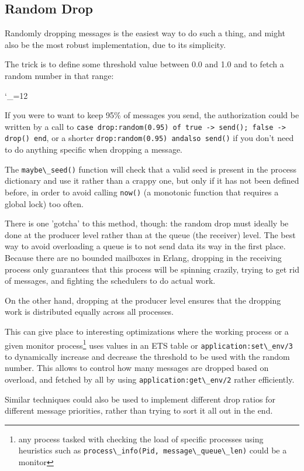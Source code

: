 \documentclass[11pt, oneside]{book}   	%
\newcommand{\function}[1]{\Verb`#1`}
\newcommand{\expression}[1]{\Verb`#1`}
\def\includecode{\begingroup
\catcode`\_=12
\includecodeB}
\newcommand{\includecodeB}[2][erlang]{\VerbatimInput[frame=single,label=#1/#2,fontsize=\small]{#1/#2}\endgroup}
\begin{document}
\subsection{Random Drop}

Randomly dropping messages is the easiest way to do such a thing, and might also be the most robust implementation, due to its simplicity.

The trick is to define some threshold value between 0.0 and 1.0 and to fetch a random number in that range:

\includecode[erlang]{drop.erl}

If you were to want to keep 95\% of messages you send, the authorization could be written by a call to \expression{case drop:random(0.95) of true -> send(); false -> drop() end}, or a shorter \expression{drop:random(0.95) andalso send()} if you don't need to do anything specific when dropping a message. 

The \function{maybe\_seed()} function will check that a valid seed is present in the process dictionary and use it rather than a crappy one, but only if it has not been defined before, in order to avoid calling \function{now()} (a monotonic function that requires a global lock) too often.

There is one 'gotcha' to this method, though: the random drop must ideally be done at the producer level rather than at the queue (the receiver) level. The best way to avoid overloading a queue is to not send data its way in the first place. Because there are no bounded mailboxes in Erlang, dropping in the receiving process only guarantees that this process will be spinning crazily, trying to get rid of messages, and fighting the schedulers to do actual work.

On the other hand, dropping at the producer level ensures that the dropping work is distributed equally across all processes.

This can give place to interesting optimizations where the working process or a given monitor process\footnote{any process tasked with checking the load of specific processes using heuristics such as \expression{process\_info(Pid, message\_queue\_len)} could be a monitor} uses values in an ETS table or \function{application:set\_env/3} to dynamically increase and decrease the threshold to be used with the random number. This allows to control how many messages are dropped based on overload, and fetched by all by using \function{application:get\_env/2} rather efficiently.

Similar techniques could also be used to implement different drop ratios for different message priorities, rather than trying to sort it all out in the end. 
\end{document}

